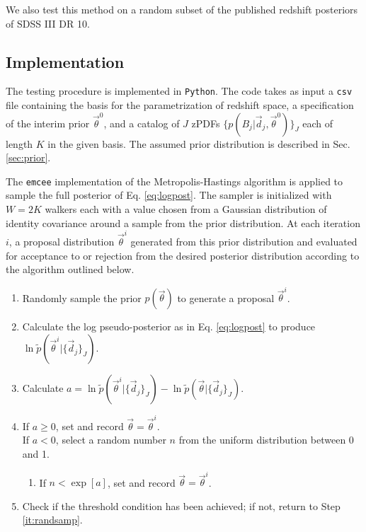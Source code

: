 \documentclass[preprint]{aastex}
\begin{document}
We also test this method on a random subset of the published redshift 
posteriors of SDSS III DR 10.  

\clearpage
\subsection{Implementation}
\label{sec:mcmc}

The testing procedure is implemented in \texttt{Python}.  The code takes as 
input a \texttt{csv} file containing the basis for the parametrization of 
redshift space, a specification of the interim prior $\vec{\theta}^{0}$, and a 
catalog of $J$ zPDFs $\{p(B_{j}|\vec{d}_{j},\vec{\theta}^{0})\}_{J}$ each of 
length $K$ in the given basis.  The assumed prior distribution is described in 
Sec. \ref{sec:prior}.

The \texttt{emcee} implementation of the Metropolis-Hastings algorithm is 
applied to sample the full posterior of Eq. \ref{eq:logpost}.   \citep{for12}   
The sampler is initialized with $W=2K$ walkers each with a value chosen from a 
Gaussian distribution of identity covariance around a sample from the prior 
distribution.  At each iteration $i$, a proposal distribution 
$\vec{\theta}^{i}$ generated from this prior distribution and evaluated for 
acceptance to or rejection from the desired posterior distribution according to 
the algorithm outlined below.  

\begin{enumerate}
\item \label{it:randsamp} Randomly sample the prior $p(\vec{\theta})$ to 
generate a proposal $\vec{\theta}^{i}$.
\item Calculate the log pseudo-posterior as in Eq. \ref{eq:logpost} to produce 
$\ln\tilde{p}(\vec{\theta}^{i}|\{\vec{d}_{j}\}_{J})$.
\item Calculate 
$a=\ln\tilde{p}(\vec{\theta}^{i}|\{\vec{d}_{j}\}_{J})-\ln\tilde{p}(\vec{\theta}|
\{\vec{d}_{j}\}_{J})$.
\item If $a\geq0$, set and record $\vec{\theta}=\vec{\theta}^{i}$.\\
If $a<0$, select a random number $n$ from the uniform distribution between 0 
and 1.
\begin{enumerate}
\item If $n<\exp[a]$, set and record $\vec{\theta}=\vec{\theta}^{i}$.
\end{enumerate}
\item Check if the threshold condition has been achieved; if not, return to 
Step \ref{it:randsamp}.
\end{enumerate}
\end{document}
